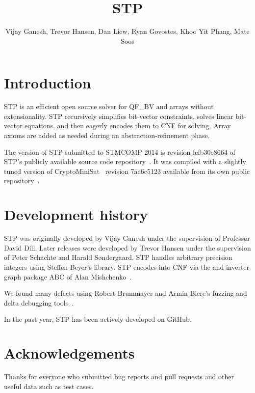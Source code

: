 \documentclass{llncs}
\begin{document}
\title{STP}
\author{Vijay Ganesh, Trevor Hansen, Dan Liew, Ryan Govostes, Khoo Yit Phang, Mate Soos}
\institute{}

\maketitle
\thispagestyle{empty}
\pagestyle{empty}

\section{Introduction}
STP\cite{Vijay:Thesis:2007} is an efficient open source solver for QF\_BV and arrays without extensionality. STP
recursively simplifies bit-vector constraints, solves linear bit-vector equations, and then eagerly encodes them to CNF
for solving. Array axioms are added as needed during an abstraction-refinement phase.

The version of STP submitted to STMCOMP 2014 is revision fcfb30e8664 of STP's publicly available source code
repository~\cite{STP:github}. It was compiled with a slightly tuned version of
CryptoMiniSat~\cite{DBLP:conf/sat/SoosNC09} revision 7ae6c5123 available from its own public
repository~\cite{CMS:github}.


\section{Development history}
STP was originally developed by Vijay Ganesh under the supervision of Professor David Dill. Later releases were
developed by Trevor Hansen under the supervision of Peter Schachte and Harald Søndergaard. STP handles arbitrary
precision integers using Steffen Beyer's library. STP encodes into CNF via the and-inverter graph package ABC of Alan
Mishchenko~\cite{Brayton:2010:AAI:2144310.2144317}.

We found many defects using Robert Brummayer and Armin Biere's
fuzzing and delta debugging tools~\cite{Brummayer:2009:FDS:1670412.1670413}.

In the past year, STP has been actively developed on GitHub.

\section*{Acknowledgements}
Thanks for everyone who submitted bug reports and pull requests and other useful data such as test cases.




\vfill
\pagebreak
\end{document}
